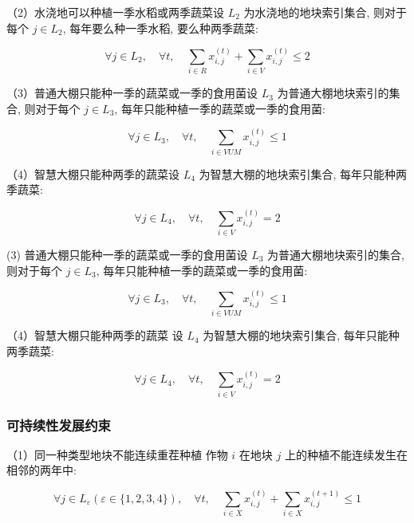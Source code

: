 \documentclass[12pt]{ctexart}
\begin{document}
	（2）水浇地可以种植一季水稻或两季蔬菜设 $L_2$ 为水浇地的地块索引集合, 则对于每个 $j \in L_2$, 每年要么种一季水稻, 要么种两季蔬菜:
	
	\begin{equation}
	\forall j \in L_2, \quad \forall t, \quad \sum_{i \in R} x_{i, j}^{(t)}+\sum_{i \in V} x_{i, j}^{(t)} \leq 2
	\end{equation}
	
	
	（3）普通大棚只能种一季的蔬菜或一季的食用菌设 $L_3$ 为普通大棚地块索引的集合, 则对于每个 $j \in L_3$, 每年只能种植一季的蔬菜或一季的食用菌:
	
	\begin{equation}
	\forall j \in L_3, \quad \forall t, \quad \sum_{i \in V U M} x_{i, j}^{(t)} \leq 1
	\end{equation}
	
	（4）智慧大棚只能种两季的蔬菜设 $L_4$ 为智慧大棚的地块索引集合, 每年只能种两季蔬菜:
	
	\begin{equation}
	\forall j \in L_4, \quad \forall t, \quad \sum_{i \in V} x_{i, j}^{(t)}=2
	\end{equation}
	
	
	(3) 普通大棚只能种一季的蔬菜或一季的食用菌设 $L_3$ 为普通大棚地块索引的集合, 则对于每个 $j \in L_3$, 每年只能种植一季的蔬菜或一季的食用菌:
	
	\begin{equation}
	\forall j \in L_3, \quad \forall t, \quad \sum_{i \in V U M} x_{i, j}^{(t)} \leq 1
	\end{equation}
	
	（4）智慧大棚只能种两季的蔬菜
	设 $L_4$ 为智慧大棚的地块索引集合, 每年只能种两季蔬菜:
	
	\begin{equation}
	\forall j \in L_4, \quad \forall t, \quad \sum_{i \in V} x_{i, j}^{(t)}=2
	\end{equation}
\subsubsection{可持续性发展约束}
	（1）同一种类型地块不能连续重茬种植
	作物 $i$ 在地块 $j$ 上的种植不能连续发生在相邻的两年中:
	
	\begin{equation}
	\forall j \in L_{\varepsilon}(\varepsilon \in\{1,2,3,4\}), \quad \forall t, \quad \sum_{i \in X} x_{i, j}^{(t)}+\sum_{i \in X} x_{i, j}^{(t+1)} \leq 1
	\end{equation}
	
\end{document}
